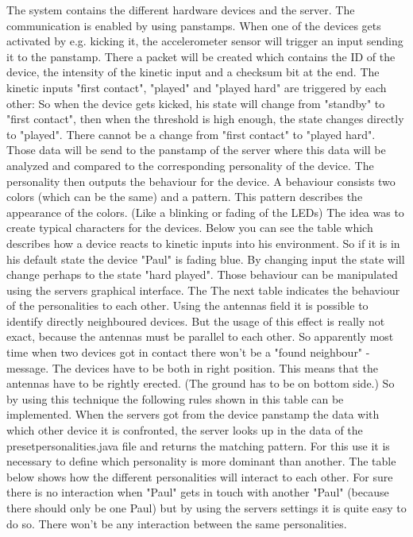 The system contains the different hardware devices and the server. The communication is enabled by using panstamps. When one of the devices gets activated by e.g. kicking it, the accelerometer sensor will trigger an input sending it to the panstamp. There a packet will be created which contains the ID of the device, the intensity of the kinetic input and a checksum bit at the end.
The kinetic inputs "first contact", "played" and "played hard" are triggered by each other:
So when the device gets kicked, his state will change from "standby" to "first contact", then when the threshold is high enough, the state changes directly to "played". There cannot be a change from "first contact" to "played hard". 
Those data will be send to the panstamp of the server where this data will be analyzed and compared to the corresponding personality of the device. The personality then outputs the behaviour for the device. A behaviour consists two colors (which can be the same) and a pattern. This pattern describes the appearance of the colors. (Like a blinking or fading of the LEDs)
The idea was to create typical characters for the devices. Below you can see the table which describes how a device reacts to kinetic inputs into his environment. So if it is in his default state the device "Paul" is fading blue. By changing input the state will change perhaps to the state "hard played". Those behaviour can be manipulated using the servers graphical interface. The %
The next table indicates the behaviour of the personalities to each other. Using the antennas field  it is possible to identify directly neighboured devices. But the usage of this effect is really not exact, because the antennas must be parallel to each other. So apparently most time when two devices got in contact there won't be a "found neighbour" - message. The devices have to be both in right position. This means that the antennas have to be rightly erected. (The ground has to be on bottom side.)   
So by using this technique the following rules shown in this table can be implemented.
When the servers got from the device panstamp the data with which other device it is confronted, the server looks up in the data of the presetpersonalities.java file and returns the matching pattern. For this use it is necessary to define which personality is more dominant than another.
The table below shows how the different personalities will interact to each other.
For sure there is no interaction when "Paul" gets in touch with another "Paul" (because there should only be one Paul) but by using the servers settings it is quite easy to do so. There won't be any interaction between the same personalities.

